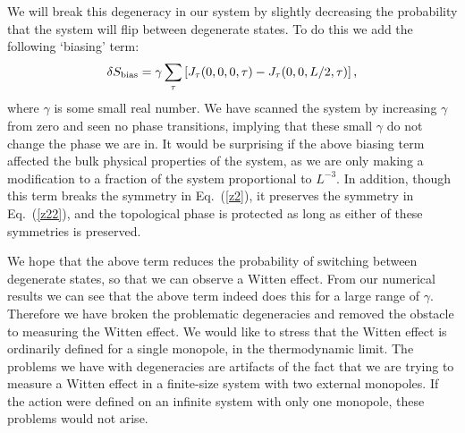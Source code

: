 \documentclass[prb,twocolumn]{revtex4-1}
\begin{document}
We will break this degeneracy in our system by slightly decreasing the probability that the system will flip between degenerate states. To do this we add the following `biasing' term:
\begin{equation}
\delta S_{\rm bias}=\gamma  \sum_{\tau}\left[J_\tau(0,0,0,\tau)-J_\tau(0,0,L/2,\tau)\right],
\label{bias}
\end{equation}
where $\gamma$ is some small real number. We have scanned the system by increasing $\gamma$ from zero and seen no phase transitions, implying that these small $\gamma$ do not change the phase we are in. It would be surprising if the above biasing term affected the bulk physical properties of the system, as we are only making a modification to a fraction of the system proportional to $L^{-3}$. In addition, though this term breaks the symmetry in Eq.~(\ref{z2}), it preserves the symmetry in Eq.~(\ref{z22}), and the topological phase is protected as long as either of these symmetries is preserved. 

We hope that the above term reduces the probability of switching between degenerate states, so that we can observe a Witten effect. From our numerical results we can see that the above term indeed does this for a large range of $\gamma$. Therefore we have broken the problematic degeneracies and removed the obstacle to measuring the Witten effect. We would like to stress that the Witten effect is ordinarily defined for a single monopole, in the thermodynamic limit. The problems we have with degeneracies are artifacts of the fact that we are trying to measure a Witten effect in a finite-size system with two external monopoles. If the action were defined on an infinite system with only one monopole, these problems would not arise.

\end{document}
